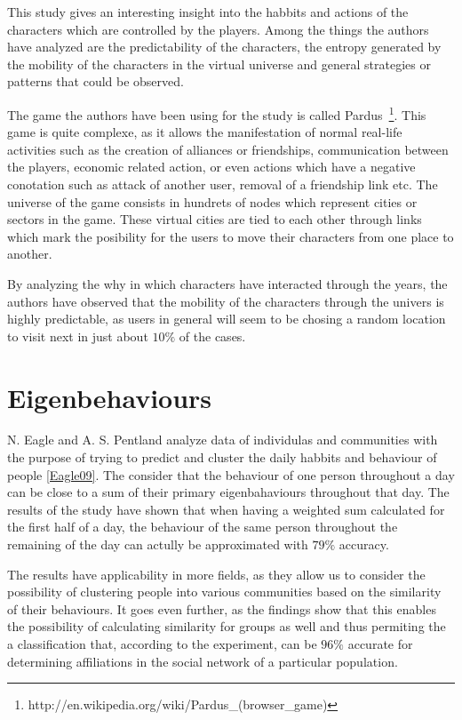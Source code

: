 This study gives an interesting insight into the habbits and actions of the
characters which are controlled by the players. Among the things the authors
have analyzed are the predictability of the characters, the entropy generated
by the mobility of the characters in the virtual universe and general
strategies or patterns that could be observed.

The game the authors have been using for the study is called
Pardus~\footnote{http://en.wikipedia.org/wiki/Pardus\_(browser\_game)}. This
game is quite complexe, as it allows the manifestation of normal real-life
activities such as the creation of alliances or friendships, communication
between the players, economic related action, or even actions which have a
negative conotation such as attack of another user, removal of a friendship
link etc. The universe of the game consists in hundrets of nodes which represent
cities or sectors in the game. These virtual cities are tied to each other
through links which mark the posibility for the users to move their characters
from one place to another.

By analyzing the why in which characters have interacted through the years, the
authors have observed that the mobility of the characters through the univers is
highly predictable, as users in general will seem to be chosing a random
location to visit next in just about $10\%$ of the cases.

\section{Eigenbehaviours }
N. Eagle and A. S. Pentland analyze data of individulas and communities with the
purpose of trying to predict and cluster the daily habbits and behaviour of
people \ref{Eagle09}. The consider that the behaviour of one person throughout a day
can be close to a sum of their primary eigenbahaviours throughout that day. The results
of the study have shown that when having a weighted sum calculated for the first
half of a day, the behaviour of the same person throughout the remaining of the
day can actully be approximated with $79\%$ accuracy. 

The results have applicability in more fields, as they allow us to consider the
possibility of clustering people into various communities based on the
similarity of their behaviours. It goes even further, as the findings show that
this enables the possibility of calculating similarity for groups as well and
thus permiting the a classification that, according to the experiment, can be
$96\%$ accurate for determining affiliations in the social network of a
particular population.

